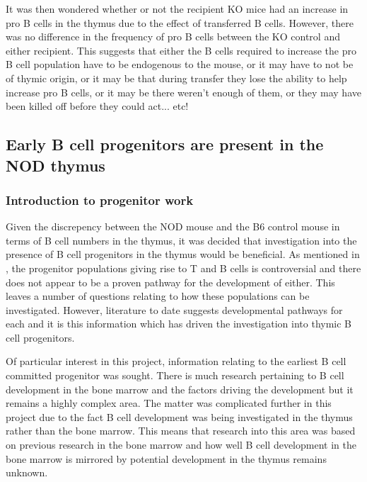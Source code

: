 It was then wondered whether or not the recipient KO mice had an increase in pro B cells in the thymus due to the effect of transferred B cells.
However, there was no difference in the frequency of pro B cells between the KO control and either recipient.
This suggests that either the B cells required to increase the pro B cell population have to be endogenous to the mouse, or it may have to not be of thymic origin, or it may be that during transfer they lose the ability to help increase pro B cells, or it may be there weren't enough of them, or they may have been killed off before they could act... etc!



\subsection{Early B cell progenitors are present in the NOD thymus}

\subsubsection{Introduction to progenitor work}

Given the discrepency between the NOD mouse and the B6 control mouse in terms of B cell numbers in the thymus, it was decided that investigation into the presence of B cell progenitors in the thymus would be beneficial.
As mentioned in , the progenitor populations giving rise to T and B cells is controversial and there does not appear to be a proven pathway for the development of either.
This leaves a number of questions relating to how these populations can be investigated.
However, literature to date suggests developmental pathways for each and it is this information which has driven the investigation into thymic B cell progenitors.

Of particular interest in this project, information relating to the earliest B cell committed progenitor was sought.
There is much research pertaining to B cell development in the bone marrow and the factors driving the development but it remains a highly complex area.
The matter was complicated further in this project due to the fact B cell development was being investigated in the thymus rather than the bone marrow.
This means that research into this area was based on previous research in the bone marrow and how well B cell development in the bone marrow is mirrored by potential development in the thymus remains unknown.

